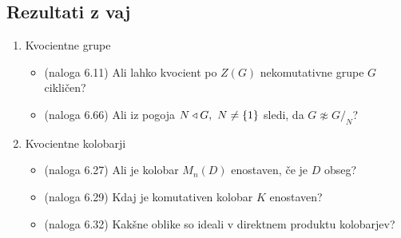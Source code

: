 \newpage
\subsection*{Rezultati z vaj}
\begin{enumerate}
    \item Kvocientne grupe
    
    \begin{itemize}
        \item (naloga 6.11) Ali lahko kvocient po \(Z(G)\) nekomutativne grupe \(G\) cikličen?
        \item (naloga 6.66) Ali iz pogoja \(N \triangleleft G, \ N \neq \{1\}\) sledi, da \(G \not \approx G/_N\)?
    \end{itemize}

    \item Kvocientne kolobarji
    \begin{itemize}
        \item (naloga 6.27) Ali je kolobar \(M_n(D)\) enostaven, če je \(D\) obseg?
        \item (naloga 6.29) Kdaj je komutativen kolobar \(K\) enostaven?
        \item (naloga 6.32) Kakšne oblike so ideali v direktnem produktu kolobarjev?
    \end{itemize}
\end{enumerate}

